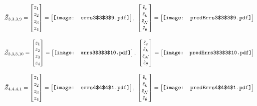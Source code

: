 \documentclass[12pt]{article}
\begin{document}
\begin{gather*}
\bar{\mathcal{Z}}_{3,3,3,9}=\begin{bmatrix}
z_1\\
z_2\\
z_3\\
z_4
 \end{bmatrix}= \begin{bmatrix}
\vcenter{\hbox{\texttt{[image: errs3\$3\$3\$9.pdf]}}}
 \end{bmatrix},\,\, \begin{bmatrix}
\hat{\epsilon}_c\\\hat{\epsilon}_k\\\hat{\epsilon}_\mathcal{N}\\\hat{\epsilon}_\theta
 \end{bmatrix}=\begin{bmatrix}
\vcenter{\hbox{\texttt{[image: predErrs3\$3\$3\$9.pdf]}}}
 \end{bmatrix}
\end{gather*}

\begin{gather*}
\bar{\mathcal{Z}}_{3,3,3,10}=\begin{bmatrix}
z_1\\
z_2\\
z_3\\
z_4
 \end{bmatrix}= \begin{bmatrix}
\vcenter{\hbox{\texttt{[image: errs3\$3\$3\$10.pdf]}}}
 \end{bmatrix},\,\, \begin{bmatrix}
\hat{\epsilon}_c\\\hat{\epsilon}_k\\\hat{\epsilon}_\mathcal{N}\\\hat{\epsilon}_\theta
 \end{bmatrix}=\begin{bmatrix}
\vcenter{\hbox{\texttt{[image: predErrs3\$3\$3\$10.pdf]}}}
 \end{bmatrix}
\end{gather*}



\begin{gather*}
\bar{\mathcal{Z}}_{4,4,4,1}=\begin{bmatrix}
z_1\\
z_2\\
z_3\\
z_4
 \end{bmatrix}= \begin{bmatrix}
\vcenter{\hbox{\texttt{[image: errs4\$4\$4\$1.pdf]}}}
 \end{bmatrix},\,\, \begin{bmatrix}
\hat{\epsilon}_c\\\hat{\epsilon}_k\\\hat{\epsilon}_\mathcal{N}\\\hat{\epsilon}_\theta
 \end{bmatrix}=\begin{bmatrix}
\vcenter{\hbox{\texttt{[image: predErrs4\$4\$4\$1.pdf]}}}
 \end{bmatrix}
\end{gather*}
\end{document}
